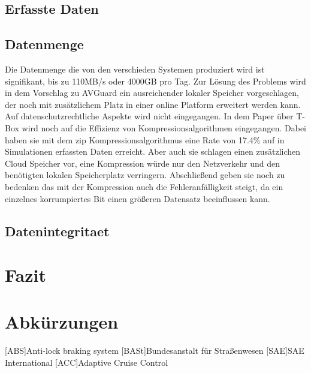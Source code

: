 \documentclass[conference,compsoc,final,a4paper]{IEEEtran}
\begin{document}
\subsection{Erfasste Daten}

\subsection{Datenmenge}
Die Datenmenge die von den verschieden Systemen produziert wird ist signifikant, bis zu 110MB/s oder 4000GB pro Tag.\cite{Hoque_2021a}
Zur Lösung des Problems wird in dem Vorschlag zu AVGuard ein ausreichender lokaler Speicher vorgeschlagen, der noch mit
zusätzlichem Platz in einer online Platform erweitert werden kann. Auf datenschutzrechtliche Aspekte wird nicht eingegangen.
In dem Paper über T-Box wird noch auf die Effizienz von Kompressionsalgorithmen eingegangen. Dabei haben sie mit dem zip Kompressionsalgorithmus
eine Rate von 17.4\% auf in Simulationen erfassten Daten erreicht. Aber auch sie schlagen einen zusätzlichen Cloud Speicher vor,
eine Kompression würde nur den Netzverkehr und den benötigten lokalen Speicherplatz verringern.
Abschließend geben sie noch zu bedenken das mit der Kompression auch die Fehleranfälligkeit steigt, da ein einzelnes korrumpiertes Bit
einen größeren Datensatz beeinflussen kann.

\subsection{Datenintegritaet}



\section{Fazit}
\section*{Abkürzungen}

\begin{acronym}[IEEE]
  [ABS]{Anti-lock braking system}
  [BASt]{Bundesanstalt für Straßenwesen}
  [SAE]{SAE International}
  [ACC]{Adaptive Cruise Control}
\end{acronym}

\printbibliography
\end{document}

